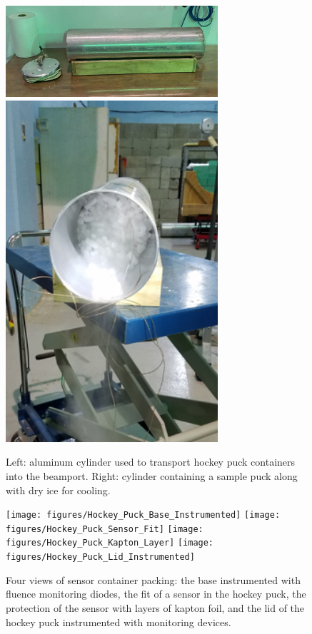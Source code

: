 \begin{figure}[!hbt]
  \begin{center}
    \includegraphics[width=0.70\textwidth]{figures/Cylinder_Side_View}
    \includegraphics[width=0.70\textwidth]{figures/Cylinder_With_Dry_Ice}
    \caption{Left: aluminum cylinder used to transport hockey puck containers into the beamport. Right: cylinder containing a sample puck along with dry ice for cooling.}
    \label{fig:Cylinder_Details}
  \end{center}
\end{figure}

  \begin{figure}[!hbt]
  \begin{center}
    \texttt{[image: figures/Hockey\_Puck\_Base\_Instrumented]}  
    \texttt{[image: figures/Hockey\_Puck\_Sensor\_Fit]}
    \texttt{[image: figures/Hockey\_Puck\_Kapton\_Layer]}
    \texttt{[image: figures/Hockey\_Puck\_Lid\_Instrumented]}    
    \caption{Four views of sensor container packing: the base instrumented with fluence monitoring diodes, the fit of a sensor in the hockey puck, the protection of the sensor with layers of kapton foil, and the lid of the hockey puck instrumented with monitoring devices.}
    \label{fig:Puck_Packing}
  \end{center}
\end{figure}

